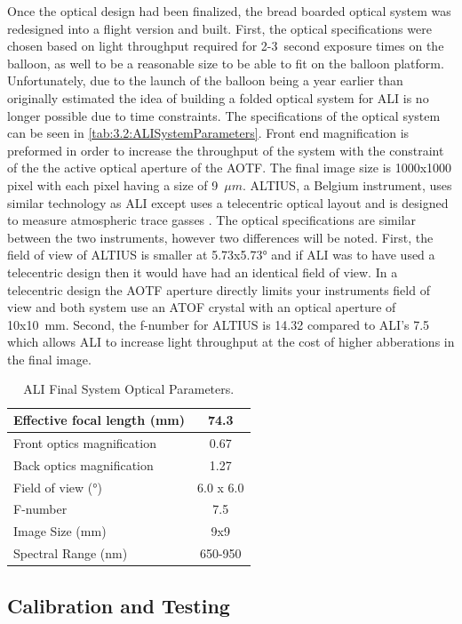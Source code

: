 Once the optical design had been finalized, the bread boarded optical system was redesigned into a flight version and built. First, the optical specifications were chosen based on light throughput required for 2-3~second exposure times on the balloon, as well to be a reasonable size to be able to fit on the balloon platform. Unfortunately, due to the launch of the balloon being a year earlier than originally estimated the idea of building a folded optical system for ALI is no longer possible due to time constraints. The specifications of the optical system can be seen in \autoref{tab:3.2:ALISystemParameters}. Front end magnification is preformed in order to increase the throughput of the system with the constraint of the  the active optical aperture of the AOTF. The final image size is 1000x1000 pixel with each pixel having a size of 9~$\mu m$. ALTIUS, a Belgium instrument, uses similar technology as ALI except uses a telecentric optical layout and is designed to measure atmospheric trace gasses \citep{Dekemper2012}. The optical specifications are similar between the two instruments, however two differences will be noted. First, the field of view of ALTIUS is smaller at 5.73x5.73\si{\degree} and if ALI was to have used a telecentric design then it would have had an identical field of view. In a telecentric design the AOTF aperture directly limits your instruments field of view and both system use an ATOF crystal with an optical aperture of 10x10~mm. Second, the f-number for ALTIUS is 14.32 compared to ALI's 7.5 which allows ALI to increase light throughput at the cost of higher abberations in the final image.

\begin{table}[!ht]
    \begin{center}
    \begin{tabular}{|l|c|}
      \hline
      Effective focal length (mm) & 74.3 \\
      \hline
      Front optics magnification & 0.67 \\
      \hline
      Back optics magnification & 1.27 \\
      \hline
      Field of view (\si{\degree}) & 6.0 x 6.0 \\
      \hline
      F-number & 7.5 \\
      \hline
      Image Size (mm) & 9x9\\
      \hline
      Spectral Range (nm) & 650-950\\
      \hline
    \end{tabular}
    \end{center}
    \caption{ALI Final System Optical Parameters.}
    \label{tab:3.2:ALISystemParameters}
\end{table}

\subsection{Calibration and Testing}
